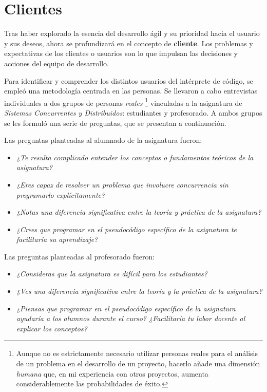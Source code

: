 \section{Clientes}
Tras haber explorado la esencia del desarrollo ágil y su prioridad hacia el usuario y sus deseos, ahora se profundizará en el concepto de \textbf{cliente}. Los problemas y expectativas de los clientes o usuarios son lo que impulsan las decisiones y acciones del equipo de desarrollo. 

\vspace{0.5cm}
Para identificar y comprender los distintos usuarios del intérprete de código, se empleó una metodología centrada en las personas. Se llevaron a cabo entrevistas individuales a dos grupos de personas \textit{reales} \footnote{Aunque no es estrictamente necesario utilizar personas reales para el análisis de un problema en el desarrollo de un proyecto, hacerlo añade una dimensión \textit{humana} que, en mi experiencia con otros proyectos, aumenta considerablemente las probabilidades de éxito.} vinculadas a la asignatura de \textit{Sistemas Concurrentes y Distribuidos}: estudiantes y profesorado. A ambos grupos se les formuló una serie de preguntas, que se presentan a continuación.

\vspace{0.5cm}
\noindent
Las preguntas planteadas al alumnado de la asignatura fueron:
\begin{itemize}
    \item \textit{¿Te resulta complicado entender los conceptos o fundamentos teóricos de la asignatura?}
    \item \textit{¿Eres capaz de resolver un problema que involucre concurrencia sin programarlo explícitamente?}
    \item \textit{¿Notas una diferencia significativa entre la teoría y práctica de la asignatura?}
    \item \textit{¿Crees que programar en el pseudocódigo específico de la asignatura te facilitaría su aprendizaje?}
\end{itemize}

\vspace{0.5cm}
\noindent
Las preguntas planteadas al profesorado fueron:
\begin{itemize}
    \item \textit{¿Consideras que la asignatura es difícil para los estudiantes?}
    \item \textit{¿Ves una diferencia significativa entre la teoría y la práctica de la asignatura?}
    \item \textit{¿Piensas que programar en el pseudocódigo específico de la asignatura ayudaría a los alumnos durante el curso? ¿Facilitaría tu labor docente al explicar los conceptos?}
\end{itemize}

